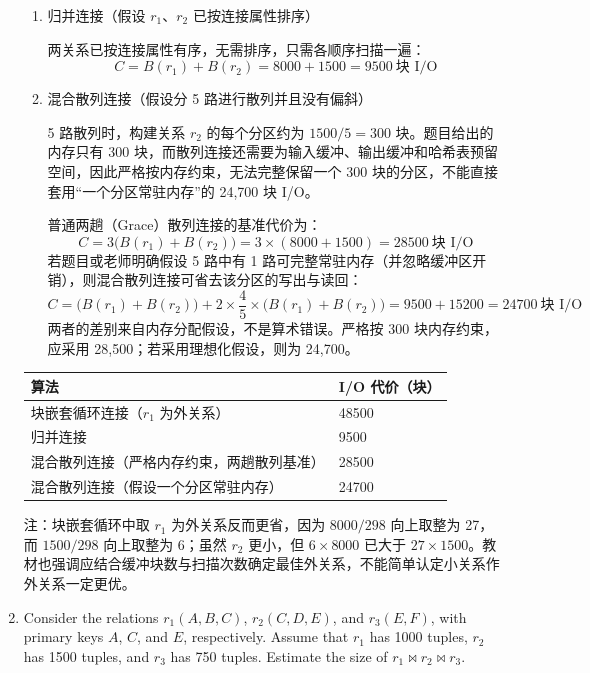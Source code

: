 \documentclass[UTF8,a4paper,11pt]{ctexart}
\newenvironment{answer}%
  {\begin{ans}\noindent{\bfseries\color{ansframe}【答案】}\hspace{0.4em}}%
  {\end{ans}}
\begin{document}
\begin{enumerate}
\begin{enumerate}
\item 归并连接（假设 $r_1$、$r_2$ 已按连接属性排序）
\begin{answer}
两关系已按连接属性有序，无需排序，只需各顺序扫描一遍：
\[
C = B(r_1)+B(r_2) = 8000+1500 = 9500\ \text{块 I/O}
\]
\end{answer}

\item 混合散列连接（假设分 5 路进行散列并且没有偏斜）
\begin{answer}
5 路散列时，构建关系 $r_2$ 的每个分区约为 $1500/5=300$ 块。题目给出的内存只有 300 块，而散列连接还需要为输入缓冲、输出缓冲和哈希表预留空间，因此严格按内存约束，无法完整保留一个 300 块的分区，不能直接套用“一个分区常驻内存”的 24,700 块 I/O。\par
普通两趟（Grace）散列连接的基准代价为：
\[
C = 3\bigl(B(r_1)+B(r_2)\bigr) = 3\times(8000+1500)=28500\ \text{块 I/O}
\]
若题目或老师明确假设 5 路中有 1 路可完整常驻内存（并忽略缓冲区开销），则混合散列连接可省去该分区的写出与读回：
\[
C = \bigl(B(r_1)+B(r_2)\bigr) + 2\times\frac{4}{5}\times\bigl(B(r_1)+B(r_2)\bigr)
  = 9500+15200 = 24700\ \text{块 I/O}
\]
两者的差别来自内存分配假设，不是算术错误。严格按 300 块内存约束，应采用 28,500；若采用理想化假设，则为 24,700。
\end{answer}
\end{enumerate}

\begin{center}
\begin{tabular}{@{}ll@{}}
\toprule
算法 & I/O 代价（块） \\
\midrule
块嵌套循环连接（$r_1$ 为外关系） & 48500 \\
归并连接 & 9500 \\
混合散列连接（严格内存约束，两趟散列基准） & 28500 \\
混合散列连接（假设一个分区常驻内存） & 24700 \\
\bottomrule
\end{tabular}
\end{center}

\noindent 注：块嵌套循环中取 $r_1$ 为外关系反而更省，因为 $8000/298$ 向上取整为 27，而 $1500/298$ 向上取整为 6；虽然 $r_2$ 更小，但 $6\times 8000$ 已大于 $27\times 1500$。教材也强调应结合缓冲块数与扫描次数确定最佳外关系，不能简单认定小关系作外关系一定更优。

\item Consider the relations $r_1(A,B,C)$, $r_2(C,D,E)$, and $r_3(E,F)$, with primary keys $A$, $C$, and $E$, respectively. Assume that $r_1$ has 1000 tuples, $r_2$ has 1500 tuples, and $r_3$ has 750 tuples. Estimate the size of $r_1\bowtie r_2\bowtie r_3$.


\end{enumerate}
\end{document}
